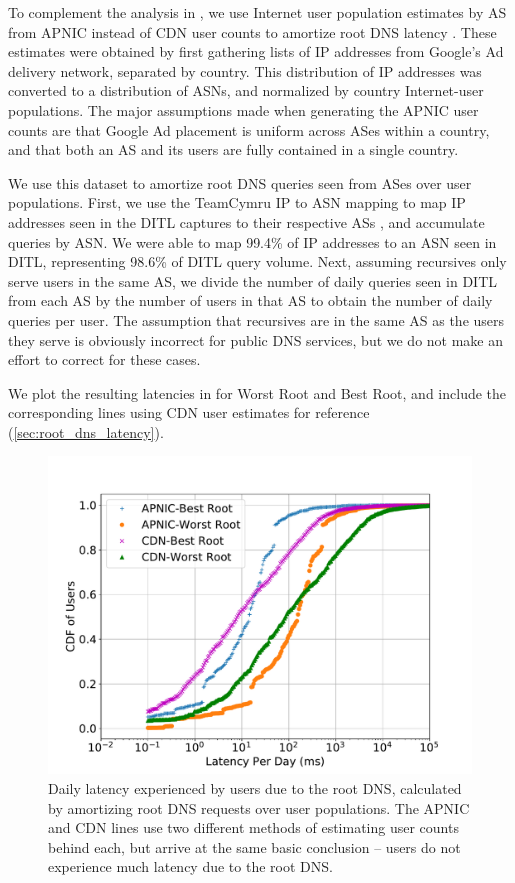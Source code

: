 \documentclass[sigconf,letterpaper,nonacm,10pt,anonymous]{acmart}
\begin{document}
To complement the analysis in , we use
Internet user population estimates by AS from APNIC instead of CDN user
counts to amortize root DNS latency \cite{apnic_pop_est}. These
estimates were obtained by first gathering lists of IP addresses from
Google's Ad delivery network, separated by country. This distribution of
IP addresses was converted to a distribution of ASNs, and normalized by
country Internet-user populations. The major assumptions made when
generating the APNIC user counts are that Google Ad placement is uniform
across ASes within a country, and that both an AS and its users are
fully contained in a single country.

We use this dataset to amortize root DNS queries seen from ASes over
user populations. First, we use the TeamCymru IP to ASN mapping to map
IP addresses seen in the DITL captures to their respective ASs
\cite{teamcymru}, and accumulate queries by ASN. We were able to map
99.4\% of IP addresses to an ASN seen in DITL, representing 98.6\% of
DITL query volume. Next, assuming recursives only serve users in the
same AS, we divide the number of daily queries seen in DITL from each AS
by the number of users in that AS to obtain the number of daily queries
per user. The assumption that recursives are in the same AS as the users
they serve is obviously incorrect for public DNS services, but we do not
make an effort to correct for these cases.

We plot the resulting latencies in 
for Worst Root and Best Root, and include the corresponding lines using
CDN user estimates for reference (\cref{sec:root_dns_latency}).

\begin{figure}
    \centering
    \includegraphics[width=\linewidth]{figures/apnic_daily_root_latency.pdf}
    \caption{Daily latency experienced by users due to the root DNS, calculated by amortizing root DNS requests over user populations. The APNIC and CDN lines use two different methods of estimating user counts behind each, but arrive at the same basic conclusion -- users do not experience much latency due to the root DNS.}
    \label{fig:apnic_daily_root_latency}
\end{figure}
\end{document}
